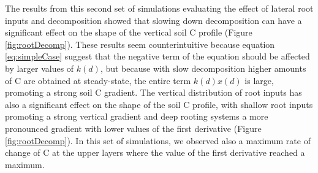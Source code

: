 \documentclass[11pt, oneside, a4paper]{article}   	%
\begin{document}
The results from this second set of simulations evaluating the effect of lateral root inputs and decomposition showed that slowing down decomposition can have a significant effect on the shape of the vertical soil C profile (Figure \ref{fig:rootDecomp}). These results seem counterintuitive because equation \ref{eq:simpleCase} suggest that the negative term of the equation should be affected by larger values of $k(d)$, but because with slow decomposition higher amounts of C are obtained at steady-state, the entire term $k(d) x(d)$ is large, promoting a strong soil C gradient. The vertical distribution of root inputs has also a significant effect on the shape of the soil C profile, with shallow root inputs promoting a strong vertical gradient and deep rooting systems a more pronounced gradient with lower values of the first derivative (Figure \ref{fig:rootDecomp}). In this set of simulations, we observed also a maximum rate of change of C at the upper layers where the value of the first derivative reached a maximum. 
\end{document}
